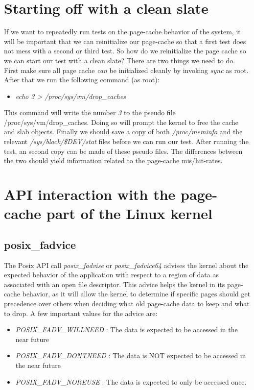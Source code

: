 \section{Starting off with a clean slate}
If we want to repeatedly run tests on the page-cache behavior of the system, it will be important that we can reinitialize our page-cache so that a first test does not mess with a second or third test. So how do we reinitialize the page cache so we can start our test with a clean slate? There are two things we need to do.  First make sure all page cache \emph{can} be initialized cleanly by invoking \emph{sync} as root. After that we run the following command (as root):
\begin{itemize}
\item \emph{echo 3 > /proc/sys/vm/drop\_caches}
\end{itemize}
This command will write the number \emph{3} to the pseudo file /proc/sys/vm/drop\_caches. Doing so will prompt the kernel to free the cache and slab objects. Finally we should save a copy of both \emph{/proc/meminfo} and the relevant \emph{/sys/block/\$DEV/stat} files before we can run our test. After running the test, an second copy can be made of these pseudo files. The differences between the two should yield information related to the page-cache mis/hit-rates.
\section{API interaction with the page-cache part of the Linux kernel}
\subsection{posix\_fadvice}
The Posix API call \emph{posix\_fadvise} or \emph{posix\_fadvice64} advises the kernel about the expected behavior of the application with respect to a region of data as associated with an open file descriptor. This advice helps the kernel in its page-cache behavior, as it will allow the kernel to determine if specific pages should get precedence over others when deciding what old page-cache data to keep and what to drop. A few important values for the advice are:
\begin{itemize}
\item \emph{POSIX\_FADV\_WILLNEED} : The data is expected to be accessed in the near future
\item \emph{POSIX\_FADV\_DONTNEED} : The data is NOT expected to be accessed in the near future
\item \emph{POSIX\_FADV\_NOREUSE} : The data is expected to only be accessed once.
\end{itemize}
